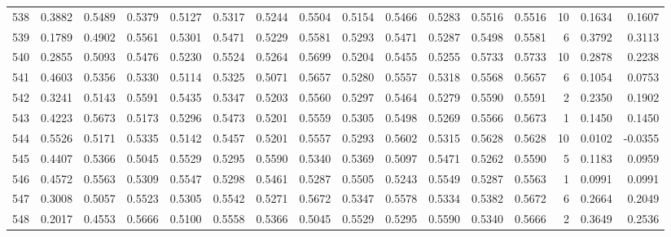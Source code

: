 \begin{tabular}{lrrrrrrrrrrrrrrr}
538 &      0.3882 &  0.5489 &  0.5379 &  0.5127 &  0.5317 &  0.5244 &  0.5504 &  0.5154 &  0.5466 &  0.5283 &   0.5516 &     0.5516 &     10 &                    0.1634 &                     0.1607 \\
539 &      0.1789 &  0.4902 &  0.5561 &  0.5301 &  0.5471 &  0.5229 &  0.5581 &  0.5293 &  0.5471 &  0.5287 &   0.5498 &     0.5581 &      6 &                    0.3792 &                     0.3113 \\
540 &      0.2855 &  0.5093 &  0.5476 &  0.5230 &  0.5524 &  0.5264 &  0.5699 &  0.5204 &  0.5455 &  0.5255 &   0.5733 &     0.5733 &     10 &                    0.2878 &                     0.2238 \\
541 &      0.4603 &  0.5356 &  0.5330 &  0.5114 &  0.5325 &  0.5071 &  0.5657 &  0.5280 &  0.5557 &  0.5318 &   0.5568 &     0.5657 &      6 &                    0.1054 &                     0.0753 \\
542 &      0.3241 &  0.5143 &  0.5591 &  0.5435 &  0.5347 &  0.5203 &  0.5560 &  0.5297 &  0.5464 &  0.5279 &   0.5590 &     0.5591 &      2 &                    0.2350 &                     0.1902 \\
543 &      0.4223 &  0.5673 &  0.5173 &  0.5296 &  0.5473 &  0.5201 &  0.5559 &  0.5305 &  0.5498 &  0.5269 &   0.5566 &     0.5673 &      1 &                    0.1450 &                     0.1450 \\
544 &      0.5526 &  0.5171 &  0.5335 &  0.5142 &  0.5457 &  0.5201 &  0.5557 &  0.5293 &  0.5602 &  0.5315 &   0.5628 &     0.5628 &     10 &                    0.0102 &                    -0.0355 \\
545 &      0.4407 &  0.5366 &  0.5045 &  0.5529 &  0.5295 &  0.5590 &  0.5340 &  0.5369 &  0.5097 &  0.5471 &   0.5262 &     0.5590 &      5 &                    0.1183 &                     0.0959 \\
546 &      0.4572 &  0.5563 &  0.5309 &  0.5547 &  0.5298 &  0.5461 &  0.5287 &  0.5505 &  0.5243 &  0.5549 &   0.5287 &     0.5563 &      1 &                    0.0991 &                     0.0991 \\
547 &      0.3008 &  0.5057 &  0.5523 &  0.5305 &  0.5542 &  0.5271 &  0.5672 &  0.5347 &  0.5578 &  0.5334 &   0.5382 &     0.5672 &      6 &                    0.2664 &                     0.2049 \\
548 &      0.2017 &  0.4553 &  0.5666 &  0.5100 &  0.5558 &  0.5366 &  0.5045 &  0.5529 &  0.5295 &  0.5590 &   0.5340 &     0.5666 &      2 &                    0.3649 &                     0.2536 \\

\end{tabular}
